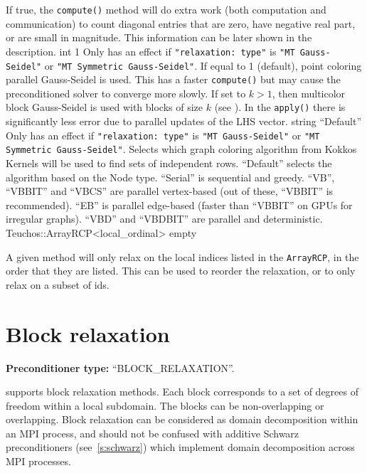     {If true, the \texttt{compute()} method will do extra work (both computation
     and communication) to count diagonal entries that are zero, have negative
     real part, or are small in magnitude. This information can be later shown
     in the description.}
    {int}
    {1}
    {Only has an effect if {\tt "relaxation: type"} is {\tt "MT Gauss-Seidel"}
     or {\tt "MT Symmetric Gauss-Seidel"}. If equal to 1 (default), point
     coloring parallel Gauss-Seidel is used. This has a faster \texttt{compute()}
     but may cause the preconditioned solver
     to converge more slowly. If set to $k > 1$, then multicolor block Gauss-Seidel
     is used with blocks of size $k$ (see \cite{Saad1999}).
     In the \texttt{apply()} there is significantly less
     error due to parallel updates of the LHS vector.}
    {string}
    {``Default''}
    {Only has an effect if {\tt "relaxation: type"} is {\tt "MT Gauss-Seidel"}
     or {\tt "MT Symmetric Gauss-Seidel"}. Selects which graph coloring algorithm
     from Kokkos Kernels will be used to find sets of independent rows. ``Default''
     selects the algorithm based on the Node type. ``Serial'' is sequential and greedy.
     ``VB'', ``VBBIT'' and ``VBCS'' are parallel vertex-based (out of these, ``VBBIT'' is recommended).
     ``EB'' is parallel edge-based (faster than ``VBBIT'' on GPUs for irregular graphs).
     ``VBD'' and ``VBDBIT'' are parallel and deterministic.}
    {Teuchos::ArrayRCP<local\_ordinal>}
    {empty}
    {}

    {A given method will only relax on the local indices listed in the
     \texttt{ArrayRCP}, in the order that they are listed. This can be used to
     reorder the relaxation, or to only relax on a subset of ids.}

\section{Block relaxation}\label{s:block_relaxation}

\textbf{Preconditioner type:} ``BLOCK\_RELAXATION''.


\ifpacktwo{} supports block relaxation methods. Each block corresponds to a set
of degrees of freedom within a local subdomain. The blocks can be
non-overlapping or overlapping. Block relaxation can be considered as domain
decomposition within an MPI process, and should not be confused with additive
Schwarz preconditioners (see~\ref{s:schwarz}) which implement domain
decomposition across MPI processes.

